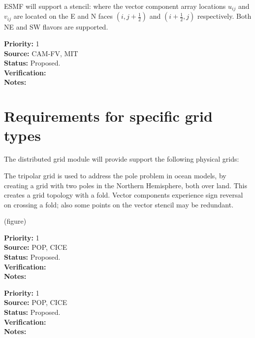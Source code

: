 \sreq{\dgrid}

ESMF will support a \dgrid stencil: where the vector component array
locations $u_{ij}$ and $v_{ij}$ are located on the E and N faces
$(i,j+\frac12)$ and $(i+\frac12,j)$ respectively. Both NE and SW
flavors are supported.

\begin{reqlist}
{\bf Priority:} 1 \\ 
{\bf Source:} CAM-FV, MIT \\
{\bf Status:} Proposed. \\
{\bf Verification:} \\
{\bf Notes:}
\end{reqlist}

\part{Requirements for specific grid types} \label{DG:gridtypes}

The distributed grid module will provide support the following 
physical grids:


The tripolar grid \cite{ref:m1996} is used to address the pole problem
in ocean models, by creating a grid with two poles in the Northern
Hemisphere, both over land. This creates a grid topology with a
fold. Vector components experience sign reversal on crossing a fold;
also some points on the vector stencil may be redundant.

(figure)

\begin{reqlist}
{\bf Priority:} 1 \\ 
{\bf Source:} POP, CICE \\
{\bf Status:} Proposed. \\
{\bf Verification:} \\
{\bf Notes:}
\end{reqlist}


\begin{reqlist}
{\bf Priority:} 1 \\ 
{\bf Source:} POP, CICE \\
{\bf Status:} Proposed. \\
{\bf Verification:} \\
{\bf Notes:}
\end{reqlist}


